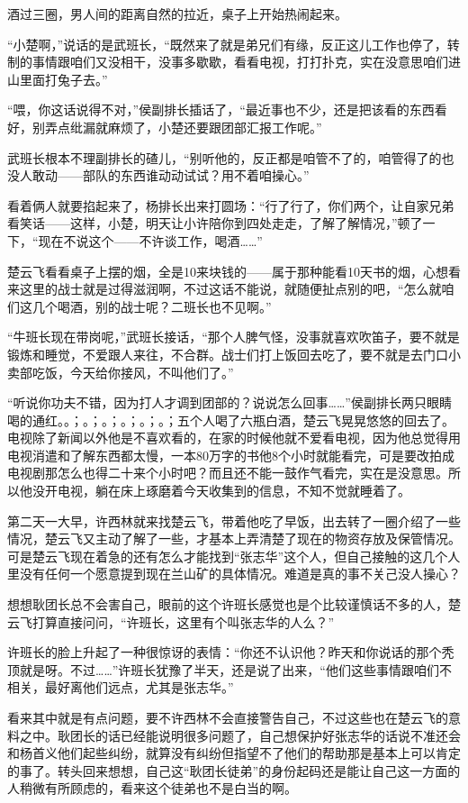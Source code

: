 酒过三圈，男人间的距离自然的拉近，桌子上开始热闹起来。

“小楚啊，”说话的是武班长，“既然来了就是弟兄们有缘，反正这儿工作也停了，转制的事情跟咱们又没相干，没事多歇歇，看看电视，打打扑克，实在没意思咱们进山里面打兔子去。”

“喂，你这话说得不对，”侯副排长插话了，“最近事也不少，还是把该看的东西看好，别弄点纰漏就麻烦了，小楚还要跟团部汇报工作呢。”

武班长根本不理副排长的碴儿，“别听他的，反正都是咱管不了的，咱管得了的也没人敢动——部队的东西谁动动试试？用不着咱操心。”

看着俩人就要掐起来了，杨排长出来打圆场：“行了行了，你们两个，让自家兄弟看笑话——这样，小楚，明天让小许陪你到四处走走，了解了解情况，”顿了一下，“现在不说这个——不许谈工作，喝酒……”

楚云飞看看桌子上摆的烟，全是10来块钱的——属于那种能看10天书的烟，心想看来这里的战士就是过得滋润啊，不过这话不能说，就随便扯点别的吧，“怎么就咱们这几个喝酒，别的战士呢？二班长也不见啊。”

“牛班长现在带岗呢，”武班长接话，“那个人脾气怪，没事就喜欢吹笛子，要不就是锻炼和睡觉，不爱跟人来往，不合群。战士们打上饭回去吃了，要不就是去门口小卖部吃饭，今天给你接风，不叫他们了。”

“听说你功夫不错，因为打人才调到团部的？说说怎么回事……”侯副排长两只眼睛喝的通红。。；。；。；。；。；。；五个人喝了六瓶白酒，楚云飞晃晃悠悠的回去了。电视除了新闻以外他是不喜欢看的，在家的时候他就不爱看电视，因为他总觉得用电视消遣和了解东西都太慢，一本80万字的书他8个小时就能看完，可是要改拍成电视剧那怎么也得二十来个小时吧？而且还不能一鼓作气看完，实在是没意思。所以他没开电视，躺在床上琢磨着今天收集到的信息，不知不觉就睡着了。

第二天一大早，许西林就来找楚云飞，带着他吃了早饭，出去转了一圈介绍了一些情况，楚云飞又主动了解了一些，才基本上弄清楚了现在的物资存放及保管情况。可是楚云飞现在着急的还有怎么才能找到“张志华”这个人，但自己接触的这几个人里没有任何一个愿意提到现在兰山矿的具体情况。难道是真的事不关己没人操心？

想想耿团长总不会害自己，眼前的这个许班长感觉也是个比较谨慎话不多的人，楚云飞打算直接问问，“许班长，这里有个叫张志华的人么？”

许班长的脸上升起了一种很惊讶的表情：“你还不认识他？昨天和你说话的那个秃顶就是呀。不过……”许班长犹豫了半天，还是说了出来，“他们这些事情跟咱们不相关，最好离他们远点，尤其是张志华。”

看来其中就是有点问题，要不许西林不会直接警告自己，不过这些也在楚云飞的意料之中。耿团长的话已经能说明很多问题了，自己想保护好张志华的话说不准还会和杨首义他们起些纠纷，就算没有纠纷但指望不了他们的帮助那是基本上可以肯定的事了。转头回来想想，自己这“耿团长徒弟”的身份起码还是能让自己这一方面的人稍微有所顾虑的，看来这个徒弟也不是白当的啊。

